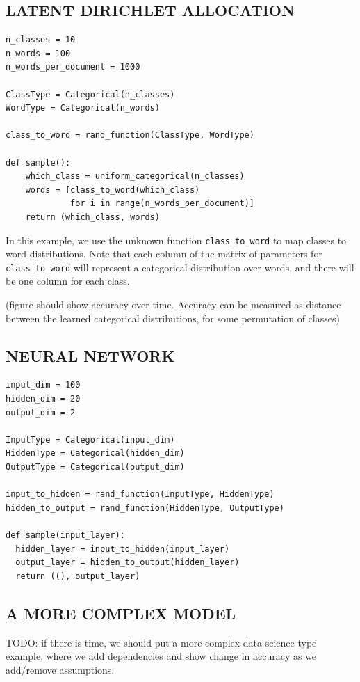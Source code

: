 \documentclass[proceed]{article}
\begin{document}
\subsection{LATENT DIRICHLET ALLOCATION}
{\small
\begin{verbatim}
n_classes = 10
n_words = 100
n_words_per_document = 1000

ClassType = Categorical(n_classes)
WordType = Categorical(n_words)

class_to_word = rand_function(ClassType, WordType)

def sample():
    which_class = uniform_categorical(n_classes)
    words = [class_to_word(which_class)
             for i in range(n_words_per_document)]
    return (which_class, words)
\end{verbatim}
}

In this example, we use the unknown function \texttt{class\_to\_word} to map classes to word distributions.  Note that each column of the matrix of parameters for \texttt{class\_to\_word} will represent a categorical distribution over words, and there will be one column for each class.

(figure should show accuracy over time.  Accuracy can be measured as distance between the learned categorical distributions, for some permutation of classes)

\subsection{NEURAL NETWORK}

{\small
\begin{verbatim}
input_dim = 100
hidden_dim = 20
output_dim = 2

InputType = Categorical(input_dim)
HiddenType = Categorical(hidden_dim)
OutputType = Categorical(output_dim)

input_to_hidden = rand_function(InputType, HiddenType)
hidden_to_output = rand_function(HiddenType, OutputType)

def sample(input_layer):
  hidden_layer = input_to_hidden(input_layer)
  output_layer = hidden_to_output(hidden_layer)
  return ((), output_layer)
\end{verbatim}
}

\subsection{A MORE COMPLEX MODEL}

TODO: if there is time, we should put a more complex data science type example, where we add dependencies and show change in accuracy as we add/remove assumptions.
\end{document}
